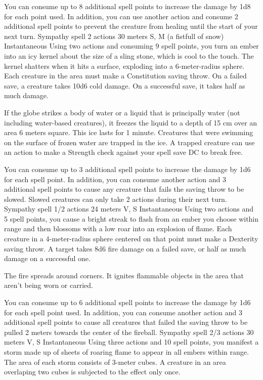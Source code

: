         You can consume up to 8 additional spell points to increase the damage by 1d8 for each point used.
        In addition, you can use another action and consume 2 additional spell points to prevent the creature from healing until the start of your next turn.
        {Sympathy spell}
        {2 actions}
        {30 meters}
        {S, M (a fistfull of snow)}
        {Instantaneous}
        Using two actions and consuming 9 spell points, you turn an ember into an icy kernel about the size of a sling stone, which is cool to the touch.
        The kernel shatters when it hits a surface, exploding into a 6-meter-radius sphere.
        Each creature in the area must make a Constitution saving throw.
        On a failed save, a creature takes 10d6 cold damage.
        On a successful save, it takes half as much damage.

        If the globe strikes a body of water or a liquid that is principally water (not including water-based creatures), it freezes the liquid to a depth of 15 cm over an area 6 meters square.
        This ice lasts for 1 minute.
        Creatures that were swimming on the surface of frozen water are trapped in the ice.
        A trapped creature can use an action to make a Strength check against your spell save DC to break free.

        You can consume up to 3 additional spell points to increase the damage by 1d6 for each spell point.
        In addition, you can consume another action and 3 additional spell points to cause any creature that fails the saving throw to be slowed.
        Slowed creatures can only take 2 actions during their next turn.
        {Sympathy spell}
        {1/2 actions}
        {24 meters}
        {V, S}
        {Instantaneous}
        Using two actions and 5 spell points, you cause a bright streak to flash from an ember you choose within range and then blossoms with a low roar into an explosion of flame.
        Each creature in a 4-meter-radius sphere centered on that point must make a Dexterity saving throw.
        A target takes 8d6 fire damage on a failed save, or half as much damage on a successful one.

        The fire spreads around corners.
        It ignites flammable objects in the area that aren't being worn or carried.

        You can consume up to 6 additional spell points to increase the damage by 1d6 for each spell point used.
        In addition, you can consume another action and 3 additional spell points to cause all creatures that failed the saving throw to be pulled 2 meters towards the center of the fireball.
        {Sympathy spell}
        {2/3 actions}
        {30 meters}
        {V, S}
        {Instantaneous}
        Using three actions and 10 spell points, you manifest a storm made up of sheets of roaring flame to appear in all embers within range.
        The area of each storm consists of 3-meter cubes.
        A creature in an area overlaping two cubes is subjected to the effect only once.


